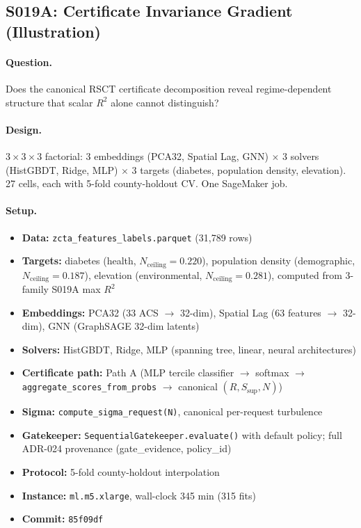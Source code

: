 \documentclass{article}
\begin{document}

\subsection{S019A: Certificate Invariance Gradient (Illustration)}
\label{app:s019a}

\paragraph{Question.} Does the canonical RSCT certificate decomposition reveal regime-dependent structure that scalar $R^2$ alone cannot distinguish?

\paragraph{Design.} $3 \times 3 \times 3$ factorial: 3 embeddings (PCA32, Spatial Lag, GNN) $\times$ 3 solvers (HistGBDT, Ridge, MLP) $\times$ 3 targets (diabetes, population density, elevation). 27 cells, each with 5-fold county-holdout CV. One SageMaker job.

\paragraph{Setup.}
\begin{itemize}
\item \textbf{Data:} \texttt{zcta\_features\_labels.parquet} (31{,}789 rows)
\item \textbf{Targets:} diabetes (health, $N_{\text{ceiling}} = 0.220$), population density (demographic, $N_{\text{ceiling}} = 0.187$), elevation (environmental, $N_{\text{ceiling}} = 0.281$), computed from 3-family S019A max $R^2$
\item \textbf{Embeddings:} PCA32 (33 ACS $\to$ 32-dim), Spatial Lag (63 features $\to$ 32-dim), GNN (GraphSAGE 32-dim latents)
\item \textbf{Solvers:} HistGBDT, Ridge, MLP (spanning tree, linear, neural architectures)
\item \textbf{Certificate path:} Path A (MLP tercile classifier $\to$ softmax $\to$ \texttt{aggregate\_scores\_from\_probs} $\to$ canonical $(R, S_{\text{sup}}, N)$)
\item \textbf{Sigma:} \texttt{compute\_sigma\_request(N)}, canonical per-request turbulence
\item \textbf{Gatekeeper:} \texttt{SequentialGatekeeper.evaluate()} with default policy; full ADR-024 provenance (gate\_evidence, policy\_id)
\item \textbf{Protocol:} 5-fold county-holdout interpolation
\item \textbf{Instance:} \texttt{ml.m5.xlarge}, wall-clock 345 min (315 fits)
\item \textbf{Commit:} \texttt{85f09df}
\end{itemize}
\end{document}
